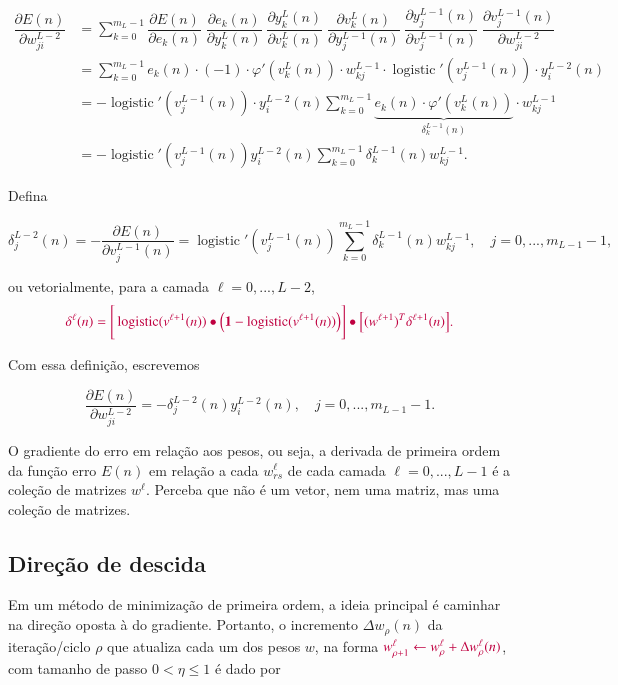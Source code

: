 \documentclass[12pt,a4paper]{article}
\DeclareMathOperator{\logistic}{logistic}
\begin{document}
$
\begin{aligned}
\dfrac{\partial E(n)}{\partial w^{L-2}_{ji}} 
&= \displaystyle\sum_{k=0}^{m_L-1}
\dfrac{\partial E(n)}{\partial e_k(n)}
\;
\dfrac{\partial e_k(n)}{\partial y^{L}_k(n)}
\;
\dfrac{\partial y^L_k(n)}{\partial v_k^{L}(n)}
\;
\dfrac{\partial v_k^L(n)}{\partial y^{L-1}_{j}(n)}
\;
\dfrac{\partial y^{L-1}_{j}(n)}{\partial v^{L-1}_{j}(n)}
\;
\dfrac{\partial v^{L-1}_{j}(n)}{\partial w^{L-2}_{ji}}
\\
&=\displaystyle\sum_{k=0}^{m_L-1}
e_k(n) \cdot (-1) \cdot
\varphi'(v_k^{L}(n)) \cdot w_{kj}^{L-1} \cdot \logistic'(v_j^{L-1}(n)) \cdot y_i^{L-2}(n)
\\
&=\displaystyle-\logistic'(v_j^{L-1}(n)) \cdot y_i^{L-2}(n)\sum_{k=0}^{m_L-1}
\underbrace{e_k(n) \cdot  
\varphi'(v_k^{L}(n))}_{\delta^{L-1}_k(n)} \cdot w_{kj}^{L-1} 
\\
&=\displaystyle-\logistic'(v_j^{L-1}(n))   y_i^{L-2}(n)\sum_{k=0}^{m_L-1}
\delta^{L-1}_k(n)  w_{kj}^{L-1} .
\end{aligned}
$

Defina

\begin{equation}\label{delta:}
\delta^{L-2}_j(n)
=
-\dfrac{\partial E(n)}{\partial v_j^{L-1}(n)}
=\displaystyle
 \logistic'(v_j^{L-1}(n))   \sum_{k=0}^{m_L-1}
\delta^{L-1}_k(n)  w_{kj}^{L-1} 
, \quad j=0,...,m_{L-1}-1,
\end{equation}

ou vetorialmente, para a camada $\ell=0,...,L-2$,
\[\color{purple}
\delta^{\ell}(n)= \Bigg[
\logistic(v^{\ell+1}(n))
\bullet
	\Big(
	\mathbf{1}-\logistic(v^{\ell+1}(n))
	\Big)
\Bigg]
\bullet \Big[(w^{\ell+1})^T\delta^{\ell+1}(n)\Big].
\]


Com essa definição, escrevemos

\begin{equation}
\dfrac{\partial E(n)}{\partial w^{L-2}_{ji}}
=
-\delta^{L-2}_j(n)y_i^{L-2}(n)
, \quad j=0,...,m_{L-1}-1 .
\end{equation}


O gradiente do erro em relação aos pesos, ou seja, a derivada de primeira ordem da função erro $E(n)$ em relação a cada $w_{rs}^\ell$ de cada camada $\ell=0,...,L-1$ é a coleção de matrizes $w^{\ell}$. Perceba que não é um vetor, nem uma matriz, mas uma coleção de matrizes.

\subsection{Direção de descida}
Em um método de minimização de primeira ordem, a ideia principal é caminhar na direção oposta à do gradiente. Portanto, o incremento $\Delta w_\rho(n)$ da iteração/ciclo $\rho$ que atualiza cada um dos pesos $w$, na forma $\color{purple}w^\ell_{\rho+1}\gets w^\ell_{\rho}+ \Delta w^\ell_\rho(n)$, com tamanho de passo $0<\eta\le1$ é dado por
\end{document}
